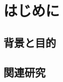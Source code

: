 \documentclass[a4paper,10.5pt]{jsreport}
\begin{document}
\chapter{はじめに}
\section{背景と目的}
\section{関連研究}
\end{document}
